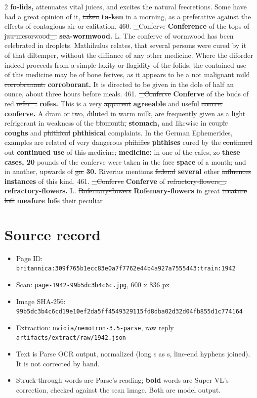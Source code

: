 \documentclass[10pt]{article}
\begin{document}
\begin{multicols}{2}
\textbf{fo-lids,} attenuates vital juices, and excites the natural feecretions. Some have had a great opinion of it, \sout{taken} \textbf{ta-ken} in a morning, as a preferative against the effects of contagious air or calitation. 460. \sout{\_Conferve} \textbf{Conference} of the tops of \sout{jau-mesorwood\_.} \textbf{sea-wormwood.} L. The conferve of wormwood has been celebrated in droplets. Mathihulus relates, that several persons were cured by it of that diltemper, without the diffiance of any other medicine. Where the diforder indeed proceeds from a simple laxity or flagidity of the folids, the contained use of this medicine may be of bone ferives, as it appears to be a not malignant mild \sout{corrobranant.} \textbf{corroborant.} It is directed to be given in the dole of half an ounce, about three hours before meals. 461. \sout{\_Conferve} \textbf{Conferve} of the buds of red \sout{refer\_.} \textbf{rofes.} This is a very \sout{apparent} \textbf{agreeable} and useful \sout{concre.} \textbf{conferve.} A dram or two, diluted in warm milk, are frequently given as a light refrigerant in weakness of the \sout{blomonth,} \textbf{stomach,} and likewise in \sout{couple} \textbf{coughs} and \sout{phithical} \textbf{phthisical} complaints. In the German Ephemerides, examples are related of very dangerous \sout{phihifies} \textbf{phthises} cured by the \sout{continned out} \textbf{continued use} of this \sout{medicine;} \textbf{medicine:} in one of \sout{the cafes, zo} \textbf{these cases, 20} pounds of the conferve were taken in the \sout{face} \textbf{space} of a month; and in another, upwards of \sout{go.} \textbf{30.} Riverius mentions \sout{federal} \textbf{several} other \sout{influences} \textbf{instances} of this kind. 461. \sout{\_Conferve} \textbf{Conferve} of \sout{refractory-flowers\_.} \textbf{refractory-flowers.} L. \sout{Rofernary-flowers} \textbf{Rofemary-flowers} in great \sout{incature loft} \textbf{meafure lofe} their peculiar
\end{multicols}
\section*{Source record}
\begin{itemize}
\item Page ID: \texttt{britannica:309f765b1ecc83e0a7f7762e44b4a927a7555443:train:1942}
\item Scan: \texttt{page-1942-99b5dc3b4c6c.jpg}, 600 x 836 px
\item Image SHA-256: \texttt{\small 99b5dc3b4c6cd19e10ef2da5ff4549329115fd8dba02d32d04fb855d1c774164}
\item Extraction: \texttt{nvidia/nemotron-3.5-parse}, raw reply \texttt{artifacts/extract/raw/1942.json}
\item Text is Parse OCR output, normalized (long s as s, line-end hyphens joined). It is not corrected by hand.
\item \sout{Struck-through} words are Parse's reading; \textbf{bold} words are Super VL's correction, checked against the scan image. Both are model output.
\end{itemize}
\end{document}
